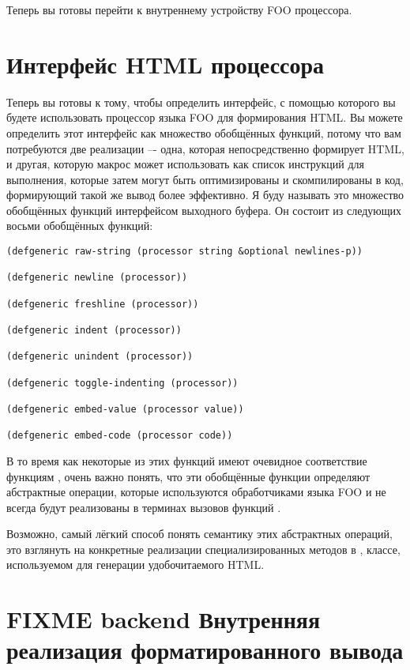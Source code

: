 Теперь вы готовы перейти к внутреннему устройству FOO процессора. 

\section{Интерфейс HTML процессора}

Теперь вы готовы к тому, чтобы определить интерфейс, с помощью которого вы будете
использовать процессор языка FOO для формирования HTML. Вы можете определить этот
интерфейс как множество обобщённых функций, потому что вам потребуются две реализации –-
одна, которая непосредственно формирует HTML, и другая, которую макрос  может
использовать как список инструкций для выполнения, которые затем могут быть оптимизированы
и скомпилированы в код, формирующий такой же вывод более эффективно. Я буду называть это
множество обобщённых функций интерфейсом выходного буфера. Он состоит из следующих восьми
обобщённых функций:

\begin{lstlisting}
(defgeneric raw-string (processor string &optional newlines-p))

(defgeneric newline (processor))

(defgeneric freshline (processor))

(defgeneric indent (processor))

(defgeneric unindent (processor))

(defgeneric toggle-indenting (processor))

(defgeneric embed-value (processor value))

(defgeneric embed-code (processor code))
\end{lstlisting}

В то время как некоторые из этих функций имеют очевидное соответствие функциям
, очень важно понять, что эти обобщённые функции определяют
абстрактные операции, которые используются обработчиками языка FOO и не всегда будут
реализованы в терминах вызовов функций .

Возможно, самый лёгкий способ понять семантику этих абстрактных операций, это взглянуть на
конкретные реализации специализированных методов в , классе,
используемом для генерации удобочитаемого HTML.

\section{FIXME backend Внутренняя реализация форматированного вывода}

